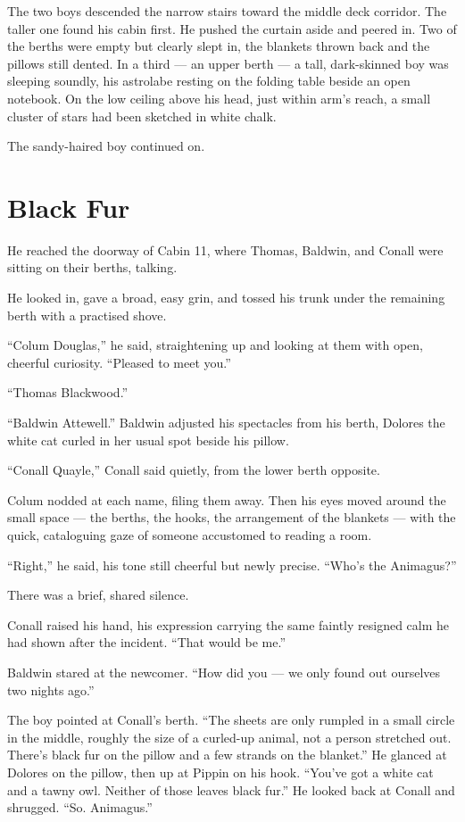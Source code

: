 The two boys descended the narrow stairs toward the middle deck corridor. The taller one found his cabin first. He pushed the curtain aside and peered in. Two of the berths were empty but clearly slept in, the blankets thrown back and the pillows still dented. In a third — an upper berth — a tall, dark-skinned boy was sleeping soundly, his astrolabe resting on the folding table beside an open notebook. On the low ceiling above his head, just within arm's reach, a small cluster of stars had been sketched in white chalk.

The sandy-haired boy continued on.

\section*{Black Fur}

He reached the doorway of Cabin 11, where Thomas, Baldwin, and Conall were sitting on their berths, talking.

He looked in, gave a broad, easy grin, and tossed his trunk under the remaining berth with a practised shove.

\enquote{Colum Douglas,} he said, straightening up and looking at them with open, cheerful curiosity. \enquote{Pleased to meet you.}

\enquote{Thomas Blackwood.}

\enquote{Baldwin Attewell.} Baldwin adjusted his spectacles from his berth, Dolores the white cat curled in her usual spot beside his pillow.

\enquote{Conall Quayle,} Conall said quietly, from the lower berth opposite.

Colum nodded at each name, filing them away. Then his eyes moved around the small space --- the berths, the hooks, the arrangement of the blankets --- with the quick, cataloguing gaze of someone accustomed to reading a room.

\enquote{Right,} he said, his tone still cheerful but newly precise. \enquote{Who's the Animagus?}

There was a brief, shared silence.

Conall raised his hand, his expression carrying the same faintly resigned calm he had shown after the incident. \enquote{That would be me.}

Baldwin stared at the newcomer. \enquote{How did you --- we only found out ourselves two nights ago.}

The boy pointed at Conall's berth. \enquote{The sheets are only rumpled in a small circle in the middle, roughly the size of a curled-up animal, not a person stretched out. There's black fur on the pillow and a few strands on the blanket.} He glanced at Dolores on the pillow, then up at Pippin on his hook. \enquote{You've got a white cat and a tawny owl. Neither of those leaves black fur.} He looked back at Conall and shrugged. \enquote{So. Animagus.}

